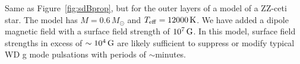 \label{fig:WDProp}
Same as Figure~\ref{fig:sdBprop}, but for the outer layers of a model of a ZZ-ceti star. The model has $M=0.6\,M_\odot$ and $T_{\rm eff} = 12000 \, {\rm K}$. We have added a dipole magnetic field with a surface field strength of $10^7 \, {\rm G}$. In this model, surface field strengths in excess of $\sim 10^4 \, {\rm G}$ are likely sufficient to suppress or modify typical WD g mode pulsations with periods of $\sim$minutes.